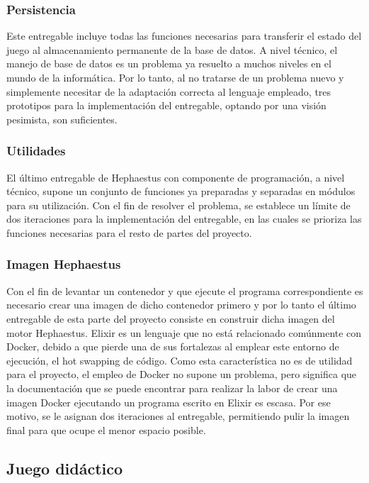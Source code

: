 \subsubsection{Persistencia}

Este entregable incluye todas las funciones necesarias para transferir el estado del juego al almacenamiento permanente de la base de datos. A nivel técnico, el manejo de base de datos es un problema ya resuelto a muchos niveles en el mundo de la informática. Por lo tanto, al no tratarse de un problema nuevo y simplemente necesitar de la adaptación correcta al lenguaje empleado, tres prototipos para la implementación del entregable, optando por una visión pesimista, son suficientes.

\subsubsection{Utilidades}

El último entregable de Hephaestus con componente de programación, a nivel técnico, supone un conjunto de funciones ya preparadas y separadas en módulos para su utilización. Con el fin de resolver el problema, se establece un límite de dos iteraciones para la implementación del entregable, en las cuales se prioriza las funciones necesarias para el resto de partes del proyecto.

\subsubsection{Imagen Hephaestus}

Con el fin de levantar un contenedor y que ejecute el programa correspondiente es necesario crear una imagen de dicho contenedor primero y por lo tanto el último entregable de esta parte del proyecto consiste en construir dicha imagen del motor Hephaestus. Elixir es un lenguaje que no está relacionado comúnmente con Docker, debido a que pierde una de sus fortalezas al emplear este entorno de ejecución, el hot swapping de código. Como esta característica no es de utilidad para el proyecto, el empleo de Docker no supone un problema, pero significa que la documentación que se puede encontrar para realizar la labor de crear una imagen Docker ejecutando un programa escrito en Elixir es escasa. Por ese motivo, se le asignan dos iteraciones al entregable, permitiendo pulir la imagen final para que ocupe el menor espacio posible.

\subsection{Juego didáctico}

